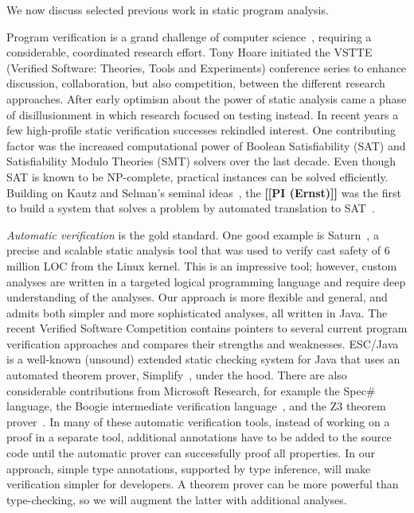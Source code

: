 \documentclass[preprint]{sig-alternate}
\newcommand{\todo}[1]{{\color{red}\bfseries [[#1]]}}
\begin{document}
We now discuss selected previous work in static program analysis.



Program verification is a grand
challenge of computer science~\cite{Hoare2003}, requiring a considerable, coordinated
research effort.
Tony Hoare initiated the VSTTE (Verified Software: Theories,
Tools and Experiments) conference series to enhance discussion,
collaboration, but also competition, between the different research
approaches.
%
After early optimism about the power of static analysis came a phase
of disillusionment in which research focused on testing instead.
In recent years a few high-profile static verification successes
rekindled interest.
One contributing factor was the increased computational power of
Boolean Satisfiability (SAT) and Satisfiability Modulo Theories (SMT)
solvers over the last decade.
Even though SAT is known to be NP-complete, practical instances can be
solved efficiently.
Building on Kautz and Selman's seminal ideas~\cite{KautzS96,KautzSM96}, the
\todo{PI (Ernst)} was the first to build a system that solves a problem by
automated translation to SAT~\cite{ernst-ijcai97}.


\emph{Automatic verification} is the gold standard.  One good example is
Saturn~\cite{AikenBDDHH2007}, a precise and scalable static analysis
tool that was used to verify cast safety of 6 million LOC from the Linux
kernel.
This is an impressive tool; however, custom analyses are written in a
targeted logical programming language and require deep understanding
of the analyses.
Our approach is more flexible and general, and admits both simpler and more
sophisticated analyses, all written in Java.
%
The recent Verified Software Competition \cite{KlebanovEA11} contains
pointers to several current program verification approaches and
compares their strengths and weaknesses.
ESC/Java \cite{Detlefs-etal98,FlanaganLLNSS02,CokK2004} is a well-known
(unsound) extended static checking system for Java that uses an automated
theorem prover, Simplify~\cite{Nelson80,DetlefsNS2003}, under the hood.
There are also considerable contributions from Microsoft Research, for
example the Spec\# \cite{BarnettEA10,LeinoMueller09a} language,
the Boogie intermediate verification language~\cite{Boogie}, and the
Z3 theorem prover~\cite{Z3}.
In many of these automatic verification tools, instead of working on a
proof in a separate tool, additional annotations have to be added to
the source code until the automatic prover can successfully proof all
properties.
In our approach, simple type annotations, supported by type inference,
will make verification simpler for developers.
A theorem prover can be more powerful than type-checking, so we will
augment the latter with additional analyses.
\end{document}
